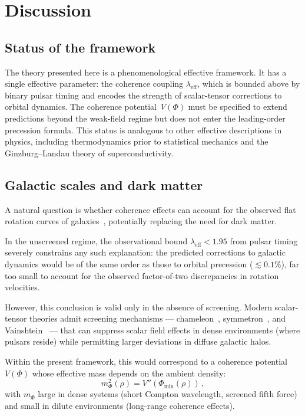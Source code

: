 \documentclass[showpacs,preprintnumbers,amsmath,amssymb,prd,longbibliography]{revtex4-2}
\begin{document}
\section{Discussion}
\label{sec:discussion}

\subsection{Status of the framework}

The theory presented here is a phenomenological effective
framework.
It has a single effective parameter: the coherence coupling
$\lambda_{\mathrm{eff}}$, which is bounded above by binary
pulsar timing and encodes the strength of scalar-tensor
corrections to orbital dynamics.
The coherence potential~$V(\Phi)$ must be specified to
extend predictions beyond the weak-field regime but does
not enter the leading-order precession formula.
This status is analogous to other effective descriptions
in physics, including thermodynamics prior to statistical
mechanics and the Ginzburg--Landau theory of
superconductivity.

\subsection{Galactic scales and dark matter}

A natural question is whether coherence effects can account
for the observed flat rotation curves of
galaxies~\cite{Sofue2001,Rubin1980},
potentially replacing the need for dark matter.

In the unscreened regime, the observational bound
$\lambda_{\mathrm{eff}} < 1.95$ from pulsar timing severely
constrains any such explanation:
the predicted corrections to galactic dynamics would be
of the same order as those to orbital precession
($\lesssim 0.1\%$), far too small to account for the
observed factor-of-two discrepancies in rotation velocities.

However, this conclusion is valid only in the absence of
screening.
Modern scalar-tensor theories admit screening mechanisms
--- chameleon~\cite{Khoury2004},
symmetron~\cite{Hinterbichler2010},
and Vainshtein~\cite{Vainshtein1972,Babichev2013} ---
that can suppress scalar field effects in dense environments
(where pulsars reside) while permitting larger deviations
in diffuse galactic halos.

Within the present framework, this would correspond to
a coherence potential~$V(\Phi)$ whose effective mass
depends on the ambient density:
\begin{equation}
m_\Phi^2(\rho) = V''(\Phi_{\min}(\rho))\,,
\end{equation}
with $m_\Phi$ large in dense systems (short Compton wavelength,
screened fifth force) and small in dilute environments
(long-range coherence effects).
\end{document}
